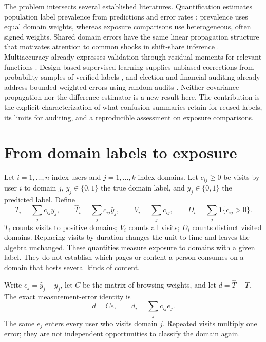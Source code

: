 \documentclass[11pt,letterpaper]{article}
\begin{document}
The problem intersects several established literatures. Quantification estimates
population label prevalence from predictions and error rates
\citep{vaz2019quantification}; prevalence uses equal domain weights, whereas
exposure comparisons use heterogeneous, often signed weights. Shared domain
errors have the same linear propagation structure that motivates attention to
common shocks in shift-share inference \citep{adao2019}. Multiaccuracy already
expresses validation through residual moments for relevant functions
\citep{kim2019}. Design-based supervised learning supplies unbiased corrections
from probability samples of verified labels \citep{egami2023}, and election and
financial auditing already address bounded weighted errors using random audits
\citep{stark2008audits,shekhar2023audits}. Neither covariance propagation nor the
difference estimator is a new result here. The contribution is the explicit
characterization of what confusion summaries retain for reused labels, its
limits for auditing, and a reproducible assessment on exposure comparisons.

\section{From domain labels to exposure}
Let $i=1,\ldots,n$ index users and $j=1,\ldots,k$ index domains. Let $c_{ij}\geq0$
be visits by user $i$ to domain $j$, $y_j\in\{0,1\}$ the true domain label, and
$\widehat y_j\in\{0,1\}$ the predicted label. Define
\begin{equation}
 T_i=\sum_j c_{ij}y_j,\qquad
 \widehat T_i=\sum_j c_{ij}\widehat y_j,\qquad
 V_i=\sum_j c_{ij},\qquad
 D_i=\sum_j\mathbf{1}\{c_{ij}>0\}.
\end{equation}
$T_i$ counts visits to positive domains; $V_i$ counts all visits; $D_i$ counts
distinct visited domains. Replacing visits by duration changes the unit to time
and leaves the algebra unchanged. These quantities measure exposure to domains
with a given label. They do not establish which pages or content a person
consumes on a domain that hosts several kinds of content.

Write $e_j=\widehat y_j-y_j$, let $C$ be the matrix of browsing weights, and let
$d=\widehat T-T$. The exact measurement-error identity is
\begin{equation}\label{eq:identity}
 d=Ce,\qquad d_i=\sum_j c_{ij}e_j.
\end{equation}
The same $e_j$ enters every user who visits domain $j$. Repeated visits multiply
one error; they are not independent opportunities to classify the domain again.
\end{document}
